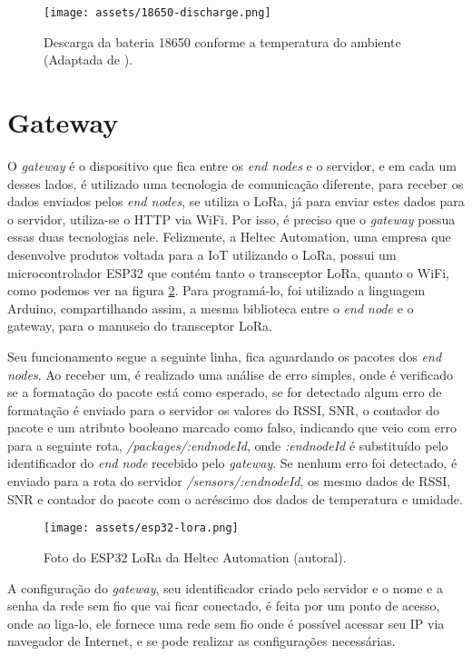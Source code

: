 \begin{figure}[H]
  \centering
  \texttt{[image: assets/18650-discharge.png]} 
  \caption{Descarga da bateria 18650 conforme a temperatura do ambiente (Adaptada de \cite{EEMB201018650}).}
  \label{fig:battery-discharge} 
\end{figure}

\section{Gateway}
\label{metod:gateway}
O \textit{gateway}  é o dispositivo que fica entre os \textit{end nodes}  e o servidor, e em cada um desses lados, é utilizado uma tecnologia de comunicação diferente, para receber os dados enviados pelos \textit{end nodes}, se utiliza o LoRa, já para enviar estes dados para o servidor, utiliza-se o HTTP via WiFi. Por isso, é preciso que o \textit{gateway}  possua essas duas tecnologias nele. Felizmente, a Heltec Automation, uma empresa que desenvolve produtos voltada para a IoT utilizando o LoRa, possui um microcontrolador ESP32 que contém tanto o transceptor LoRa, quanto o WiFi, como podemos ver na figura \ref{fig:esp32-lora}. Para programá-lo, foi utilizado a linguagem Arduino, compartilhando assim, a mesma biblioteca entre o \textit{end node} e o gateway, para o manuseio do transceptor LoRa.

Seu funcionamento segue a seguinte linha, fica aguardando os pacotes dos \textit{end nodes}. Ao receber um, é realizado uma análise de erro simples, onde é verificado se a formatação do pacote está como esperado, se for detectado algum erro de formatação é enviado para o servidor os valores do RSSI, SNR, o contador do pacote e um atributo booleano marcado como falso, indicando que veio com erro para a seguinte rota, \textit{/packages/:endnodeId}, onde \textit{:endnodeId} é substituído pelo identificador do \textit{end node} recebido pelo \textit{gateway}. Se nenhum erro foi detectado, é enviado para a rota do servidor \textit{/sensors/:endnodeId}, os mesmo dados de RSSI, SNR e contador do pacote com o acréscimo dos dados de temperatura e umidade.

\begin{figure}[H]
  \centering
  \texttt{[image: assets/esp32-lora.png]} 
  \caption{Foto do ESP32 LoRa da Heltec Automation (autoral).}
  \label{fig:esp32-lora} 
\end{figure}

A configuração do \textit{gateway}, seu identificador criado pelo servidor e o nome e a senha da rede sem fio que vai ficar conectado, é feita por um ponto de acesso, onde ao liga-lo, ele fornece uma rede sem fio onde é possível acessar seu IP via navegador de Internet, e se pode realizar as configurações necessárias.

